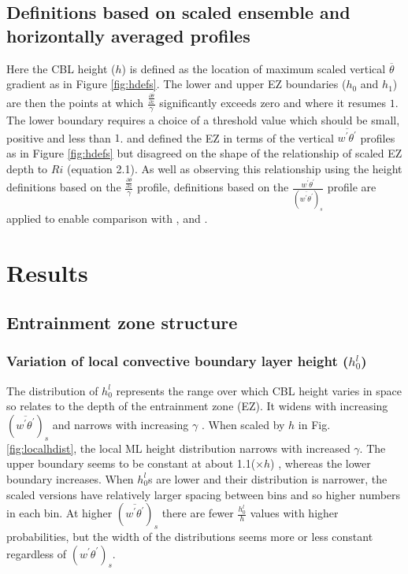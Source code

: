 \documentclass[referee]{svjour3}
\begin{document}
\subsection{Definitions based on scaled ensemble and horizontally averaged profiles}

Here the CBL height ($h$) is defined as the location of maximum scaled vertical $\overline{\theta}$ gradient as in Figure \ref{fig:hdefs}.  The lower and upper EZ boundaries ($h_{0}$ and $h_{1}$) are then the points at which $\frac{\frac{\partial \overline{\theta}}{\partial z}}{\gamma}$ significantly exceeds zero and where it resumes $1$.  The lower boundary requires a choice of a threshold value which should be small, positive and less than $1$. \cite{Fedorovich04} and \cite{Brooks12} defined the EZ in terms of the vertical $\overline{w^{'}\theta^{'}}$ profiles as in Figure \ref{fig:hdefs} but disagreed on the shape of the relationship of scaled EZ depth to $Ri$ (equation 2.1).  As well as observing this relationship using the height definitions based on the $\frac{\frac{\partial \overline{\theta}}{\partial z}}{\gamma}$ profile, definitions based on the $\frac{\overline{w^{'}\theta^{'}}}{(\overline{w^{'}\theta^{'}})_{s}}$ profile are applied to enable comparison with \cite{Brooks12}, \cite{Fedorovich04} and \cite{Garcia14}.\\  


\section{Results}
\subsection{Entrainment zone structure}

\subsubsection{Variation of local convective boundary layer height ($h_{0}^{l}$)}
\label{subsubsec:loccblh}


The distribution of $h_{0}^{l}$ represents the range over which CBL height varies in space so relates to the depth of the entrainment zone (EZ).  It widens with increasing $(\overline{w^{'}\theta^{'}})_{s}$ and narrows with increasing $\gamma$ \citep{Nchap14}.  When scaled by $h$ in Fig. \ref{fig:localhdist}, the local ML height distribution narrows with increased $\gamma$.  The upper boundary seems to be constant at about 1.1($\times h$) , whereas the lower boundary increases.  When $h_{0}^{l}$s are lower and their distribution is narrower, the scaled versions have relatively larger spacing between bins and so higher numbers in each bin. At higher $(\overline{w^{'}\theta^{'}})_{s}$ there are fewer $\frac{h_{0}^{l}}{h}$ values with higher probabilities, but the width of the distributions seems more or less constant regardless of $(w^{'}\theta^{'})_{s}$.\\
\end{document}
